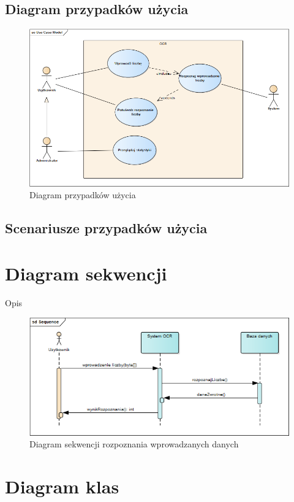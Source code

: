 \documentclass[wmii,inf,mgr]{uwmthesis}
\begin{document}
\subsection{Diagram przypadków użycia}

\begin{figure}[!ht]
  \centering
    \includegraphics[scale=0.6]{UseCaseModel.png}
	\caption{Diagram przypadków użycia}
\end{figure}

\subsection{Scenariusze przypadków użycia}
\section{Diagram sekwencji}
Opis
\begin{figure}[ht]
	\centering
		\includegraphics[scale=0.6]{Sequence.png}
	\caption{Diagram sekwencji rozpoznania wprowadzanych danych}
	\label{fig:Sequence}
\end{figure}

\section{Diagram klas}
\end{document}
